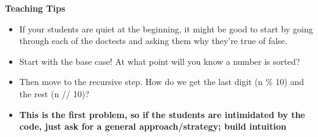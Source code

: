 \begin{guide}
\begin{blocksection}
  \textbf{Teaching Tips}
  \begin{itemize}
      \item If your students are quiet at the beginning, it might be good to start by going through each of the doctests and asking them why they're true of false.
      \item Start with the base case! At what point will you know a number is sorted?
      \item Then move to the recursive step. How do we get the last digit (n \% 10) and the rest (n // 10)?
      \item \textbf{This is the first problem, so if the students are intimidated by the code, just ask for a general approach/strategy; build intuition}
  \end{itemize}
\end{blocksection}
\end{guide}
